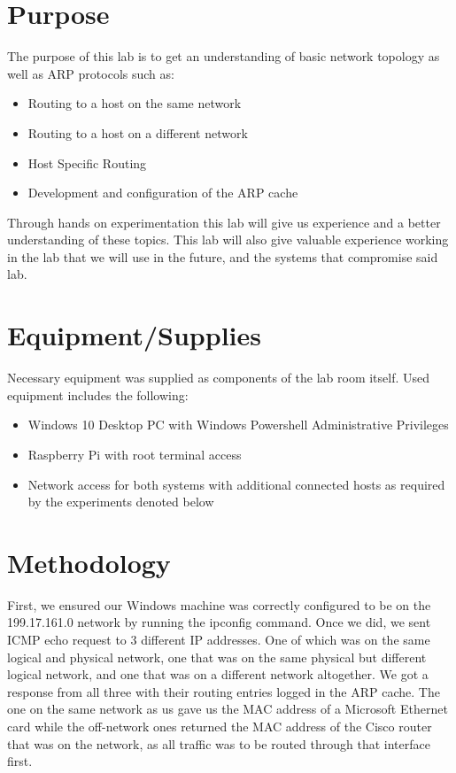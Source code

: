 \documentclass[prb,preprint]{revtex4-1}
\begin{document}
\section{Purpose}
The purpose of this lab is to get an understanding of basic network topology as well as ARP protocols such as:
\begin{itemize}
\item Routing to a host on the same network
\item Routing to a  host on a different network
\item Host Specific Routing
\item Development and configuration of the ARP cache
\end{itemize}
Through hands on experimentation this lab will give us experience and a better understanding of these topics. This lab will also give valuable experience working in the lab that we will use in the future, and the systems that compromise said lab.

\section{Equipment/Supplies}
Necessary equipment was supplied as components of the lab room itself. Used equipment includes the following:
\begin{itemize}
	\item Windows 10 Desktop PC with Windows Powershell Administrative Privileges
	\item Raspberry Pi with root terminal access
	\item Network access for both systems with additional connected hosts as required by the experiments denoted below
\end{itemize}

\section{Methodology}
First, we ensured our Windows machine was correctly configured to be on the 199.17.161.0 network by running the ipconfig command. Once we did, we sent ICMP echo request to 3 different IP addresses. One of which was on the same logical and physical network, one that was on the same physical but different logical network, and one that was on a different network altogether. We got a response from all three with their routing entries logged in the ARP cache. The one on the same network as us gave us the MAC address of a Microsoft Ethernet card while the off-network ones returned the MAC address of the Cisco router that was on the network, as all traffic was to be routed through that interface first.
\end{document}
